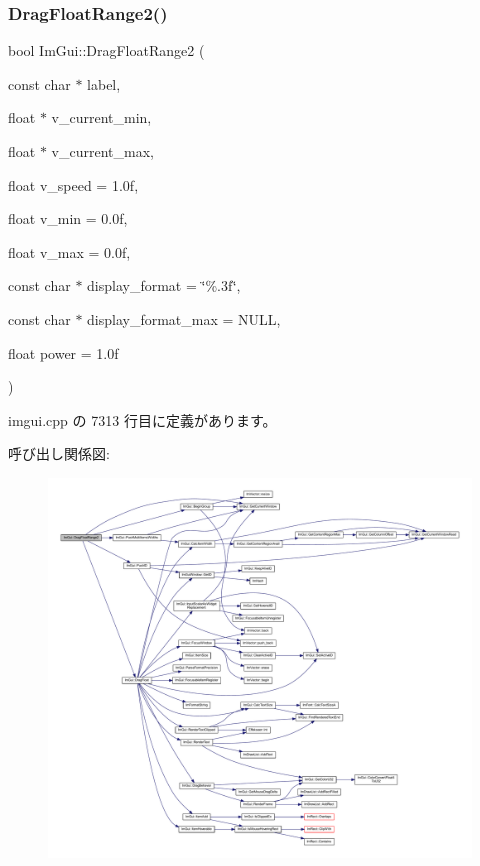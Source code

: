 \subsubsection{\texorpdfstring{Drag\+Float\+Range2()}{DragFloatRange2()}}
{\footnotesize\ttfamily bool Im\+Gui\+::\+Drag\+Float\+Range2 (\begin{DoxyParamCaption}\item[{const char $\ast$}]{label,  }\item[{float $\ast$}]{v\+\_\+current\+\_\+min,  }\item[{float $\ast$}]{v\+\_\+current\+\_\+max,  }\item[{float}]{v\+\_\+speed = {\ttfamily 1.0f},  }\item[{float}]{v\+\_\+min = {\ttfamily 0.0f},  }\item[{float}]{v\+\_\+max = {\ttfamily 0.0f},  }\item[{const char $\ast$}]{display\+\_\+format = {\ttfamily \char`\"{}\%.3f\char`\"{}},  }\item[{const char $\ast$}]{display\+\_\+format\+\_\+max = {\ttfamily NULL},  }\item[{float}]{power = {\ttfamily 1.0f} }\end{DoxyParamCaption})}



 imgui.\+cpp の 7313 行目に定義があります。

呼び出し関係図\+:\nopagebreak
\begin{figure}[H]
\begin{center}
\leavevmode
\includegraphics[width=350pt]{namespace_im_gui_ad6e3b0e5a2171679c53d6b18e16a460b_cgraph}
\end{center}
\end{figure}
\mbox{\label{namespace_im_gui_abc3ac739a79de5897b61df4e6764fc9e}} 
